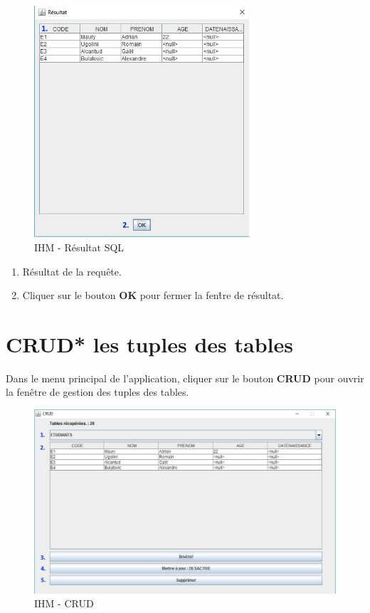 \begin{figure}[!h]
\centering
\includegraphics[width=8cm]{./images/manuel/sql_result.jpg}
\caption{IHM - Résultat SQL}
\label{sql_result}
\end{figure}

\begin{enumerate}
\item Résultat de la requ\^ete.
\item Cliquer sur le bouton \textbf{OK} pour fermer la fen\^tre de résultat.
\end{enumerate}

\section{CRUD* les tuples des tables}
Dans le menu principal de l'application, cliquer sur le bouton \textbf{CRUD} pour ouvrir la fen\^etre de gestion des tuples des tables.
\begin{figure}[!h]
\centering
\includegraphics[width=12cm]{./images/manuel/crud.jpg}
\caption{IHM - CRUD}
\label{crud}
\end{figure}

